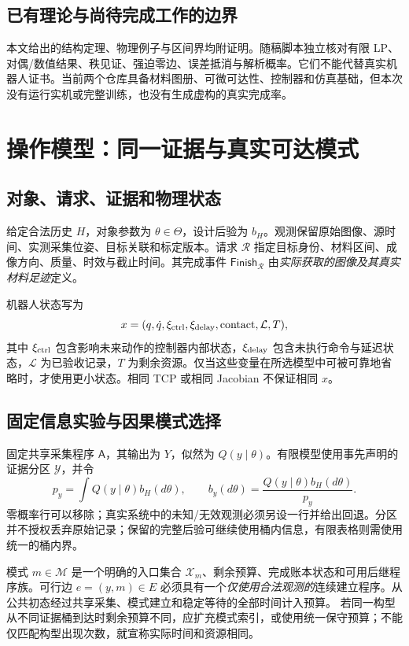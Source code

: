 \documentclass[UTF8,11pt,a4paper,fontset=fandol]{ctexart}
\numberwithin{equation}{section}
\theoremstyle{definition}
\begin{document}
\subsection{已有理论与尚待完成工作的边界}
本文给出的结构定理、物理例子与区间界均附证明。随稿脚本独立核对有限 LP、对偶/数值结果、秩见证、强迫零边、误差抵消与解析概率。它们不能代替真实机器人证书。当前两个仓库具备材料图册、可微可达性、控制器和仿真基础，但本次没有运行实机或完整训练，也没有生成虚构的真实完成率。

\section{操作模型：同一证据与真实可达模式}
\label{sec:model}

\subsection{对象、请求、证据和物理状态}
给定合法历史 $H$，对象参数为 $\theta\in\Theta$，设计后验为 $b_H$。观测保留原始图像、源时间、实测采集位姿、目标关联和标定版本。请求 $\mathcal R$ 指定目标身份、材料区间、成像方向、质量、时效与截止时间。其完成事件 $\mathsf{Finish}_{\mathcal R}$ 由\emph{实际获取的图像及其真实材料足迹}定义。

机器人状态写为
\begin{equation}
x=(q,\dot q,\xi_{\rm ctrl},\xi_{\rm delay},\text{contact},\mathcal L,T),
\end{equation}
其中 $\xi_{\rm ctrl}$ 包含影响未来动作的控制器内部状态，$\xi_{\rm delay}$ 包含未执行命令与延迟状态，$\mathcal L$ 为已验收记录，$T$ 为剩余资源。仅当这些变量在所选模型中可被可靠地省略时，才使用更小状态。相同 TCP 或相同 Jacobian 不保证相同 $x$。

\subsection{固定信息实验与因果模式选择}
固定共享采集程序 $\mathsf A$，其输出为 $Y$，似然为 $Q(y\mid\theta)$。有限模型使用事先声明的证据分区 $\mathcal Y$，并令
\begin{equation}
p_y=\int Q(y\mid\theta)b_H(d\theta),\qquad
b_y(d\theta)=\frac{Q(y\mid\theta)b_H(d\theta)}{p_y}.
\label{eq:posterior}
\end{equation}
零概率行可以移除；真实系统中的未知/无效观测必须另设一行并给出回退。分区并不授权丢弃原始记录；保留的完整后验可继续使用桶内信息，有限表格则需使用统一的桶内界。

模式 $m\in\mathcal M$ 是一个明确的入口集合 $\mathcal X_m$、剩余预算、完成账本状态和可用后继程序族。可行边 $e=(y,m)\in E$ 必须具有一个\emph{仅使用合法观测的}连续建立程序。从公共初态经过共享采集、模式建立和稳定等待的全部时间计入预算。
若同一构型从不同证据桶到达时剩余预算不同，应扩充模式索引，或使用统一保守预算；不能仅匹配构型出现次数，就宣称实际时间和资源相同。
\end{document}
